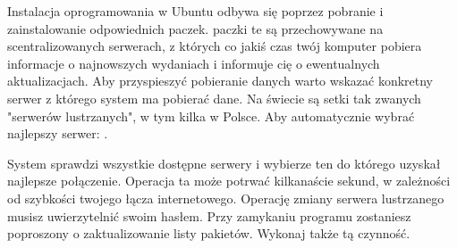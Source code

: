 Instalacja oprogramowania w Ubuntu odbywa się poprzez pobranie i zainstalowanie odpowiednich paczek. paczki te są przechowywane na scentralizowanych serwerach, z których co jakiś czas twój komputer pobiera informacje o najnowszych wydaniach i informuje cię o ewentualnych aktualizacjach. Aby przyspieszyć pobieranie danych warto wskazać konkretny serwer z którego system ma pobierać dane. Na świecie są setki tak zwanych "serwerów lustrzanych", w tym kilka w Polsce. Aby automatycznie wybrać najlepszy serwer: .

System sprawdzi wszystkie dostępne serwery i wybierze ten do którego uzyskał najlepsze połączenie. Operacja ta może potrwać kilkanaście sekund, w zależności od szybkości twojego łącza internetowego. Operację zmiany serwera lustrzanego musisz uwierzytelnić swoim hasłem. Przy zamykaniu programu zostaniesz poproszony o zaktualizowanie listy pakietów. Wykonaj także tą czynność.